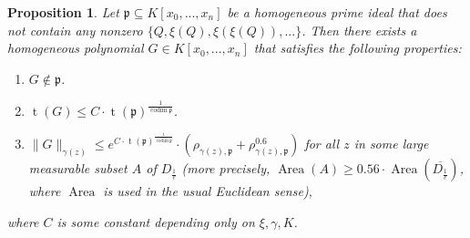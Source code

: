\documentclass[reqno]{amsart}
\theoremstyle{plain}
\newtheorem{Prop}[Cor]{Proposition}
\theoremstyle{definition}
\theoremstyle{remark}
\theoremstyle{plain}
\begin{document}
\begin{Prop}\label{Proposition construction of G}
 Let $\mathfrak p\subseteq K[x_0,...,x_n]$ be a homogeneous prime ideal that does not contain any nonzero $\{Q,\xi(Q),\xi(\xi(Q)),...\}$. Then there exists a homogeneous polynomial $G\in K[x_0,...,x_n]$ that satisfies the following properties:
\begin{enumerate}
    \item $G\not\in\mathfrak p$.
    \item $\operatorname{t}(G)\leq C\cdot\operatorname{t}(\mathfrak p)^\frac1{\operatorname{codim}\mathfrak p}$.
    \item  $\|G\|_{\gamma(z)}
        \leq
    e^{C\cdot\operatorname{t}(\mathfrak{p})^{\frac1{\operatorname{codim} \mathfrak{p}}}}\cdot(\rho_{\gamma(z), \mathfrak{p}} + \rho_{\gamma(z), \mathfrak{p}}^{0.6})$ for all $z$ in some large measurable subset $A$ of $D_\frac1e$ (more precisely, $\operatorname{Area}(A)\geq 0.56\cdot\operatorname{Area}(\overline{D_\frac1e})$, where $\operatorname{Area}$ is used in the usual Euclidean sense),
\end{enumerate}
where $C$ is some constant depending only on $\xi,\gamma,K$.
\end{Prop}
\end{document}
